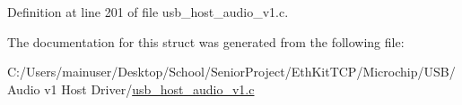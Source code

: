 Definition at line 201 of file usb\+\_\+host\+\_\+audio\+\_\+v1.\+c.



The documentation for this struct was generated from the following file\+:\begin{DoxyCompactItemize}
\item 
C\+:/\+Users/mainuser/\+Desktop/\+School/\+Senior\+Project/\+Eth\+Kit\+T\+C\+P/\+Microchip/\+U\+S\+B/\+Audio v1 Host Driver/\hyperlink{usb__host__audio__v1_8c}{usb\+\_\+host\+\_\+audio\+\_\+v1.\+c}\end{DoxyCompactItemize}
